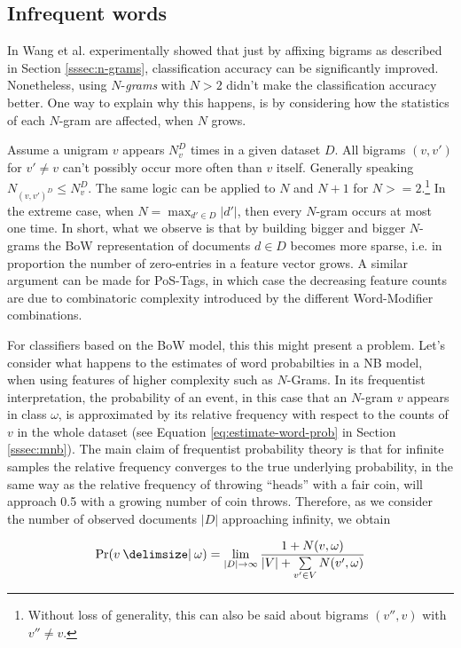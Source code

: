 \subsection{Infrequent words}
\label{ssec:unfreq-words}

In \cite{wang2012baselines} Wang et al. experimentally showed that just by
affixing bigrams as described in Section \ref{sssec:n-grams}, classification
accuracy can be significantly improved.
Nonetheless, using $N$-\textit{grams} with $N > 2$ didn't make the
classification accuracy better.
One way to explain why this happens, is by considering how the
statistics of each $N$-gram are affected, when $N$ grows.

Assume a unigram $v$ appears $N_v^D$ times in a given dataset $D$. All bigrams
$(v,v')$ for $v' \neq v$ can't possibly occur more often than  $v$ itself.
Generally speaking $N_{(v,v')^D} \leq N_v^D$.
The same logic can be applied to $N$ and $N+1$ for $N >= 2$.\footnote{Without loss of generality, 
this can also be said about bigrams $(v'',v)$ with $v '' \neq v$.} In the
extreme case, when $N = \max_{d' \in D} |d'|$, then every $N$-gram occurs at most one time. In short,
what we observe is that by building bigger and bigger $N$-grams the
BoW representation of documents $d \in D$ becomes more sparse, i.e. in
proportion the number of zero-entries in a feature vector grows. A similar
argument can be made for PoS-Tags, in which case the decreasing feature counts
are due to combinatoric complexity introduced by the different Word-Modifier
combinations.

For classifiers based on the BoW model, this this might present a problem. 
Let's consider what happens to the estimates of word probabilties in a NB model, 
when using features of higher complexity such as $N$-Grams. 
In its frequentist interpretation, the probability of an event, in this case that an
$N$-gram $v$ appears in class $\omega$, is approximated by
its relative frequency with respect to the counts of $v$ in the whole dataset
(see Equation \ref{eq:estimate-word-prob} in Section \ref{sssec:mnb}). The
main claim of frequentist probability theory is that for infinite samples the 
relative frequency converges to the true underlying probability, in the same
way as the relative frequency of throwing ``heads'' with a fair coin, will
approach 0.5 with a growing number of coin throws. Therefore, as we consider the
number of observed documents $|D|$ approaching infinity, we obtain

\begin{equation*}
\Pr(v \given \omega) = \lim_{|D| \to \infty} \frac{1 + N(v,\omega)
}{|V| + \sum\limits_{v'\in V} N(v',\omega)}
\end{equation*}

